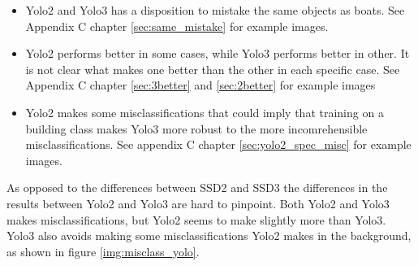\begin{itemize}
    \item Yolo2 and Yolo3 has a disposition to mistake the same objects as boats. See Appendix C chapter \ref{sec:same_mistake} for example images.
    \item Yolo2 performs better in some cases, while Yolo3 performs better in other. It is not clear what makes one better than the other in each specific case. See Appendix C chapter \ref{sec:3better} and \ref{sec:2better} for example images
    \item Yolo2 makes some misclassifications that could imply that training on a building class makes Yolo3 more robust to the more incomrehensible misclassifications. See appendix C chapter \ref{sec:yolo2_spec_misc} for example images.
\end{itemize}

As opposed to the differences between SSD2 and SSD3 the differences in the results between Yolo2 and Yolo3 are hard to pinpoint. Both Yolo2 and Yolo3 makes misclassifications, but Yolo2 seems to make slightly more than Yolo3. Yolo3 also avoids making some misclassifications Yolo2 makes in the background, as shown in figure \ref{img:misclass_yolo}.

